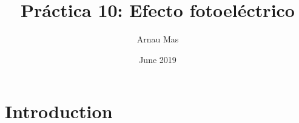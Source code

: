 \documentclass{article}
\title{Práctica 10: Efecto fotoeléctrico}
\author{Arnau Mas}
\date{June 2019}
\begin{document}
\maketitle

\section{Introduction}
\end{document}
